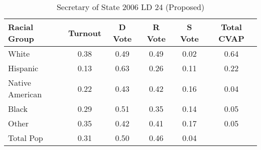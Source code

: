 \begin{table}[htb]
\begin{center}
\caption{Secretary of State 2006 LD 24 (Proposed)}
\label{sos06_cvap_ld_24}
\begin{tabular}{lccccc}
  \hline
Racial Group & Turnout & D Vote & R Vote & S Vote & Total CVAP \\ 
  \hline
White & 0.38 & 0.49 & 0.49 & 0.02 & 0.64 \\ 
  Hispanic & 0.13 & 0.63 & 0.26 & 0.11 & 0.22 \\ 
  Native American & 0.22 & 0.43 & 0.42 & 0.16 & 0.04 \\ 
  Black & 0.29 & 0.51 & 0.35 & 0.14 & 0.05 \\ 
  Other & 0.35 & 0.42 & 0.41 & 0.17 & 0.05 \\ 
  Total Pop & 0.31 & 0.50 & 0.46 & 0.04 &  \\ 
   \hline
\end{tabular}
\end{center}
\end{table}
